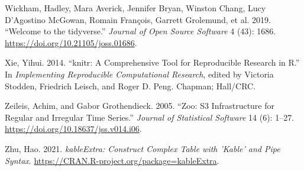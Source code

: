 \documentclass[
  letterpaper,
  DIV=11,
  numbers=noendperiod]{scrartcl}
\newlength{\cslhangindent}
\newenvironment{CSLReferences}[2] %
 {\begin{list}{}{%
  \setlength{\itemindent}{0pt}
  \setlength{\leftmargin}{0pt}
  \setlength{\parsep}{0pt}
  \ifodd #1
   \setlength{\leftmargin}{\cslhangindent}
   \setlength{\itemindent}{-1\cslhangindent}
  \fi
  \setlength{\itemsep}{#2\baselineskip}}}
 {\end{list}}
\begin{document}
\begin{CSLReferences}{1}{0}
Wickham, Hadley, Mara Averick, Jennifer Bryan, Winston Chang, Lucy
D'Agostino McGowan, Romain François, Garrett Grolemund, et al. 2019.
{``Welcome to the {tidyverse}.''} \emph{Journal of Open Source Software}
4 (43): 1686. \url{https://doi.org/10.21105/joss.01686}.

Xie, Yihui. 2014. {``{knitr}: A Comprehensive Tool for Reproducible
Research in {R}.''} In \emph{Implementing Reproducible Computational
Research}, edited by Victoria Stodden, Friedrich Leisch, and Roger D.
Peng. Chapman; Hall/CRC.

Zeileis, Achim, and Gabor Grothendieck. 2005. {``Zoo: S3 Infrastructure
for Regular and Irregular Time Series.''} \emph{Journal of Statistical
Software} 14 (6): 1--27. \url{https://doi.org/10.18637/jss.v014.i06}.

Zhu, Hao. 2021. \emph{kableExtra: Construct Complex Table with 'Kable'
and Pipe Syntax}. \url{https://CRAN.R-project.org/package=kableExtra}.

\end{CSLReferences}
\end{document}
